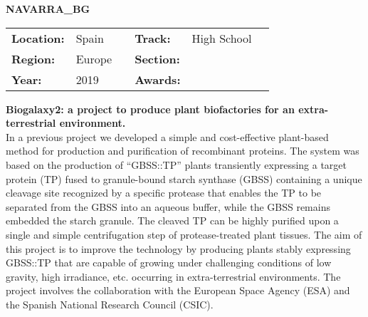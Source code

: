 \textbf{\uppercase{Navarra\_BG}}
\FloatBarrier
\begin{table}[h]
\begin{tabular}{lp{2.5cm}llll}
\textbf{Location:} & Spain & \multicolumn{1}{|l}{} & \textbf{Track:}   & High School \\
\textbf{Region:}   & Europe   & \multicolumn{1}{|l}{} & \textbf{Section:} &  \\
\textbf{Year:}     & 2019   & \multicolumn{1}{|l}{} & \textbf{Awards:}  &
\end{tabular}
\end{table}
\FloatBarrier
\noindent	\textbf{Biogalaxy2: a project to produce plant biofactories for an extra-terrestrial environment.} \vspace{.2cm}\\
In a previous project we developed a simple and cost-effective plant-based method for production and purification of recombinant proteins. The system was based on the production of “GBSS::TP” plants transiently expressing a target protein (TP) fused to granule-bound starch synthase (GBSS) containing a unique cleavage site recognized by a specific protease that enables the TP to be separated from the GBSS into an aqueous buffer, while the GBSS remains embedded the starch granule. The cleaved TP can be highly purified upon a single and simple centrifugation step of protease-treated
plant tissues. 
The aim of this project is to improve the technology by producing plants stably expressing GBSS::TP that are capable of growing under challenging conditions of low gravity, high irradiance, etc. occurring in extra-terrestrial environments. 
The project involves the collaboration with the European Space Agency (ESA) and the Spanish National Research Council (CSIC).
\vspace{2cm}


